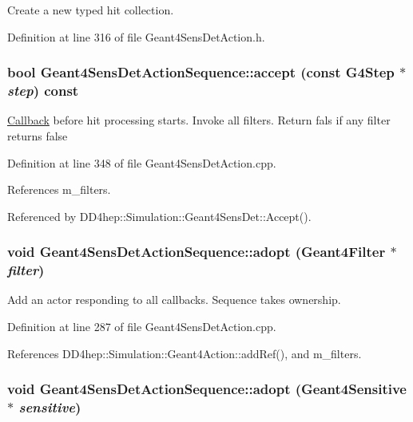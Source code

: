 Create a new typed hit collection. 

Definition at line 316 of file Geant4SensDetAction.h.\hypertarget{class_d_d4hep_1_1_simulation_1_1_geant4_sens_det_action_sequence_a91a3ce22bc0e78c28496e77113596829}{
\subsubsection[{accept}]{\setlength{\rightskip}{0pt plus 5cm}bool Geant4SensDetActionSequence::accept (const G4Step $\ast$ {\em step}) const}}
\label{class_d_d4hep_1_1_simulation_1_1_geant4_sens_det_action_sequence_a91a3ce22bc0e78c28496e77113596829}


\hyperlink{class_d_d4hep_1_1_callback}{Callback} before hit processing starts. Invoke all filters. Return fals if any filter returns false 

Definition at line 348 of file Geant4SensDetAction.cpp.

References m\_\-filters.

Referenced by DD4hep::Simulation::Geant4SensDet::Accept().\hypertarget{class_d_d4hep_1_1_simulation_1_1_geant4_sens_det_action_sequence_a89fcbc8c65a95890ea349087ac4834ec}{
\subsubsection[{adopt}]{\setlength{\rightskip}{0pt plus 5cm}void Geant4SensDetActionSequence::adopt ({\bf Geant4Filter} $\ast$ {\em filter})}}
\label{class_d_d4hep_1_1_simulation_1_1_geant4_sens_det_action_sequence_a89fcbc8c65a95890ea349087ac4834ec}


Add an actor responding to all callbacks. Sequence takes ownership. 

Definition at line 287 of file Geant4SensDetAction.cpp.

References DD4hep::Simulation::Geant4Action::addRef(), and m\_\-filters.\hypertarget{class_d_d4hep_1_1_simulation_1_1_geant4_sens_det_action_sequence_a01437840682e0edbee69d11c99f73b5f}{
\subsubsection[{adopt}]{\setlength{\rightskip}{0pt plus 5cm}void Geant4SensDetActionSequence::adopt ({\bf Geant4Sensitive} $\ast$ {\em sensitive})}}
\label{class_d_d4hep_1_1_simulation_1_1_geant4_sens_det_action_sequence_a01437840682e0edbee69d11c99f73b5f}


